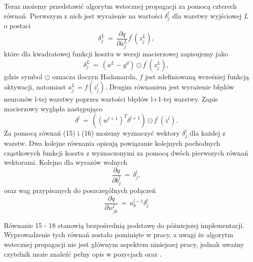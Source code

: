 \par Teraz możemy przedstawić algorytm wstecznej propagacji za pomocą czterech równań. Pierwszym z nich jest wyrażenie na wartości \(\delta_j^l \) dla warstwy wyjściowej \( L \) o postaci 
\begin{equation}
\delta_j^L \, = \, \frac{\partial q}{\partial a_j^L}f^{\prime}(z_j^L),
\end{equation}
które dla kwadratowej funkcji kosztu w wersji macierzowej zapisujemy jako
\begin{equation}
\delta_j^L \, = \, (a^L - y^d)\odot f^{\prime}(z_j^L),
\end{equation}
gdzie symbol \( \odot \) oznacza iloczyn Hadamarda, \( f \) jest zdefiniowaną wcześniej funkcją aktywacji, natomiast \( a_j^L = f(z_j^l) \). 
Drugim równaniem jest wyrażenie błędów neuronów l-tej warstwy poprzez wartości błędów l+1-tej warstwy. Zapis macierzowy wygląda następująco 
\begin{equation}
\delta^l \, = \, ((w^{l+1})^T\delta^{l+1}) \odot f^{\prime}(z^l). 
\end{equation}
Za pomocą równań (15) i (16) możemy wyznaczyć wektory \( \delta_j^l \) dla każdej z warstw. Dwa kolejne równania opisują powiązanie kolejnych pochodnych cząstkowych funkcji kosztu z wyznaczonymi za pomocą dwóch pierwszych równań wektorami. Kolejno dla wyrazów wolnych
\begin{equation}
\frac{\partial q}{\partial b_j^l} \, = \, \delta_j^l , 
\end{equation}
oraz wag przypisanych do poszczególnych połączeń
\begin{equation}
\frac{\partial q}{\partial w_{jk}^l} \, = \, a_k^{l-1}\delta _j^l
\end{equation}
\par Równanie 15 - 18 stanowią bezpośrednią podstawę do póżniejszej implementacji. Wyprowadzenie tych równań zostało pominięte w pracy, z uwagi że algorytm wstecznej propagacji nie jest głównym aspektem niniejszej pracy, jednak uważny czytelnik może znaleźć pełny opis w pozycjach \cite{osowski2013} oraz \cite{nielsen2015}. 

